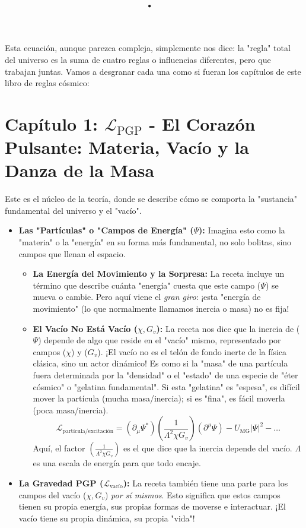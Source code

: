 \title {\Lagrangiano\d} 
Esta ecuación, aunque parezca compleja, simplemente nos dice: la "regla" total del universo es la suma de cuatro reglas o influencias diferentes, pero que trabajan juntas. Vamos a desgranar cada una como si fueran los capítulos de este libro de reglas cósmico:

\section*{\centering Capítulo 1: $\mathcal{L}_{\text{PGP}}$ - El Corazón Pulsante: Materia, Vacío y la Danza de la Masa}

Este es el núcleo de la teoría, donde se describe cómo se comporta la "sustancia" fundamental del universo y el "vacío".

\begin{itemize}
    \item \textbf{Las "Partículas" o "Campos de Energía" ($\Psi$):} Imagina esto como la "materia" o la "energía" en su forma más fundamental, no solo bolitas, sino campos que llenan el espacio.
    \begin{itemize}
        \item \textbf{La Energía del Movimiento y la Sorpresa:} La receta incluye un término que describe cuánta "energía" cuesta que este campo ($\Psi$) se mueva o cambie. Pero aquí viene el \textit{gran giro}: ¡esta "energía de movimiento" (lo que normalmente llamamos inercia o masa) no es fija!
        \item \textbf{El Vacío No Está Vacío ($\chi, G_v$):} La receta nos dice que la inercia de ($\Psi$) depende de algo que reside en el "vacío" mismo, representado por campos ($\chi$) y ($G_v$). ¡El vacío no es el telón de fondo inerte de la física clásica, sino un actor dinámico! Es como si la "masa" de una partícula fuera determinada por la "densidad" o el "estado" de una especie de "éter cósmico" o "gelatina fundamental". Si esta "gelatina" es "espesa", es difícil mover la partícula (mucha masa/inercia); si es "fina", es fácil moverla (poca masa/inercia).
        \[
        \mathcal{L}_{\text{partícula/excitación}} = (\partial_\mu\Psi^*) \left(\frac{1}{\Lambda^2\chi G_v}\right) (\partial^\mu\Psi) - U_{\text{MG}}|\Psi|^2 - \dots
        \]
        Aquí, el factor $\left(\frac{1}{\Lambda^2\chi G_v}\right)$ es el que dice que la inercia depende del vacío. $\Lambda$ es una escala de energía para que todo encaje.
    \end{itemize}
    \item \textbf{La Gravedad PGP ($\mathcal{L}_{\text{vacío}}$):} La receta también tiene una parte para los campos del vacío ($\chi, G_v$) \textit{por sí mismos}. Esto significa que estos campos tienen su propia energía, sus propias formas de moverse e interactuar. ¡El vacío tiene su propia dinámica, su propia "vida"!

\end{itemize}
